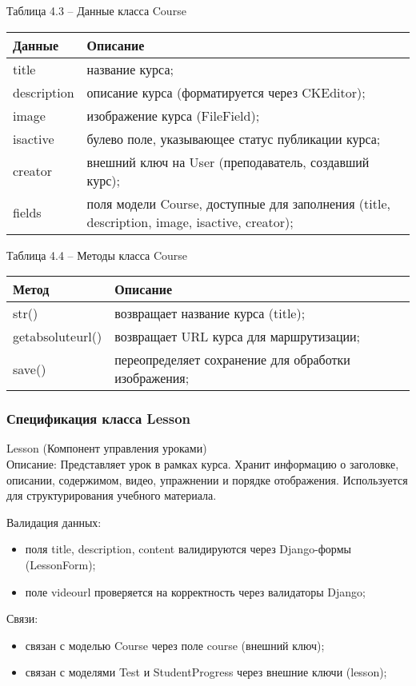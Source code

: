 Таблица 4.3 – Данные класса Course \\
\begin{tabular}{|p{4cm}|p{8cm}|}
	\hline
	Данные & Описание \\
	\hline
	title & название курса; \\
	description & описание курса (форматируется через CKEditor); \\
	image & изображение курса (FileField); \\
	isactive & булево поле, указывающее статус публикации курса; \\
	creator & внешний ключ на User (преподаватель, создавший курс); \\
	fields & поля модели Course, доступные для заполнения (title, description, image, isactive, creator); \\
	\hline
\end{tabular}

Таблица 4.4 – Методы класса Course \\
\begin{tabular}{|p{4cm}|p{8cm}|}
	\hline
	Метод & Описание \\
	\hline
	str() & возвращает название курса (title); \\
	getabsoluteurl() & возвращает URL курса для маршрутизации; \\
	save() & переопределяет сохранение для обработки изображения; \\
	\hline
\end{tabular}

\subsubsection{Спецификация класса Lesson}
Lesson (Компонент управления уроками) \\
Описание: Представляет урок в рамках курса. Хранит информацию о заголовке, описании, содержимом, видео, упражнении и порядке отображения. Используется для структурирования учебного материала.

Валидация данных: 
\begin{itemize}
	\item поля title, description, content валидируются через Django-формы (LessonForm); 
	\item поле videourl проверяется на корректность через валидаторы Django; 
\end{itemize}

Связи: 
\begin{itemize}
	\item связан с моделью Course через поле course (внешний ключ); 
	\item связан с моделями Test и StudentProgress через внешние ключи (lesson); 
\end{itemize}

